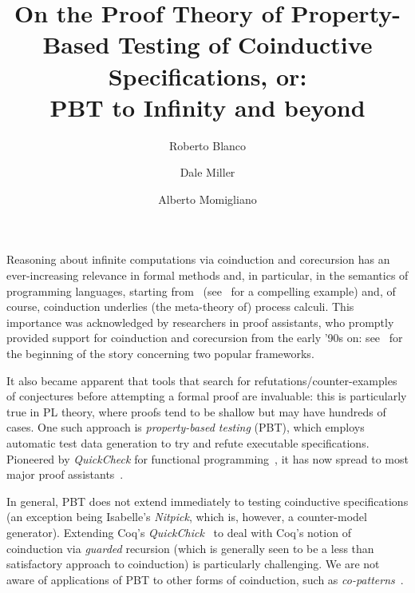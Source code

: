 \documentclass[submission,copyright,creativecommons]{eptcs}
\title{On the Proof Theory of Property-Based Testing of Coinductive Specifications, or:\\
 PBT to Infinity and beyond}
\author{Roberto Blanco
\institute{INRIA Paris, France}
\and Dale Miller
\institute{INRIA Saclay \\ LIX, \'Ecole Polytechnique, France}
\and Alberto Momigliano
\institute{DI, Universit\`a degli Studi di Milano, Italy}
}
\begin{document}
\maketitle

Reasoning about infinite computations via coinduction and corecursion
has an ever-increasing relevance in formal methods and, in particular,
in the semantics of programming languages, starting
from~\cite{milner91tcs} (see~\cite{2007-Leroy-Grall} for a
compelling example) and, of course, coinduction underlies (the
meta-theory of) process calculi. This importance was acknowledged by researchers
in proof assistants, who promptly provided support for coinduction and
corecursion from the early '90s on: see~\cite{Paulson97,Gim95types}
for the beginning of the story concerning two popular frameworks.

It also became apparent that tools that search for
refutations/counter-examples of conjectures before attempting a
formal proof are invaluable: this is particularly true in PL theory,
where proofs tend to be shallow but may have hundreds of cases.  One
such approach is \emph{property-based testing} (PBT), which employs
automatic test data generation to try and refute executable
specifications.  Pioneered by \emph{QuickCheck} for functional
programming~\cite{claessen00icfp}, it has now spread to most major
proof assistants~\cite{BlanchetteBN11,QChick}.

In general, PBT does not extend immediately to testing coinductive specifications (an
exception being Isabelle's \emph{Nitpick}, which is, however, a
counter-model generator).  Extending Coq's
\emph{QuickChick}~\cite{QChick} to deal with Coq's notion of
coinduction via \emph{guarded} recursion (which is generally seen to
be a less than satisfactory approach to coinduction) is particularly
challenging.  We are not aware of applications of PBT to other forms
of coinduction, such as \emph{co-patterns}~\cite{AbelPTS13}.
\end{document}
